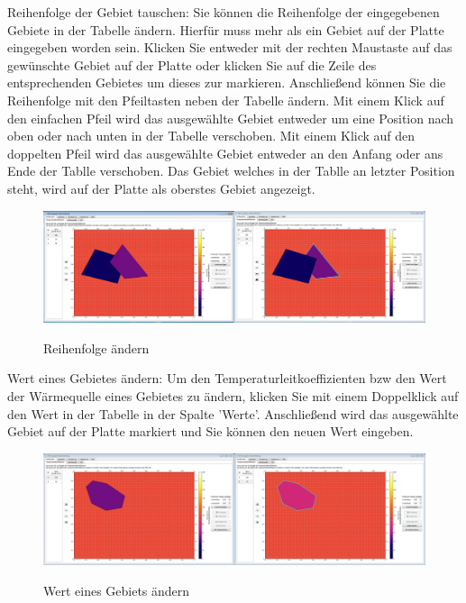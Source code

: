 \noindent
Reihenfolge der Gebiet tauschen: Sie können die Reihenfolge der eingegebenen Gebiete in der Tabelle ändern. Hierfür muss mehr als ein Gebiet auf der Platte eingegeben worden sein. Klicken Sie entweder mit der rechten Maustaste auf das gewünschte Gebiet auf der Platte oder klicken Sie auf die Zeile des entsprechenden Gebietes um dieses zur markieren. Anschließend können Sie die Reihenfolge mit den Pfeiltasten neben der Tabelle ändern. Mit einem Klick auf den einfachen Pfeil wird das ausgewählte Gebiet entweder um eine Position nach oben oder nach unten in der Tabelle verschoben. Mit einem Klick auf den doppelten Pfeil wird das ausgewählte Gebiet entweder an den Anfang oder ans Ende der Tablle verschoben. Das Gebiet welches in der Tablle an letzter Position steht, wird auf der Platte als oberstes Gebiet angezeigt.
\begin{figure}[H]
\centering
\includegraphics[scale=.25]{Benutzerdokumentation/ReihenfolgeAendern.png}\\
\caption{Reihenfolge ändern}
\label{ReihenfolgeAendern}
\end{figure}

\newpage
\noindent
Wert eines Gebietes ändern: Um den Temperaturleitkoeffizienten bzw den Wert der Wärmequelle eines Gebietes zu ändern, klicken Sie mit einem Doppelklick auf den Wert in der Tabelle in der Spalte 'Werte'. Anschließend wird das ausgewählte Gebiet auf der Platte markiert und Sie können den neuen Wert eingeben.
\begin{figure}[H]
\centering
\includegraphics[scale=.25]{Benutzerdokumentation/WertAendern.png}\\
\caption{Wert eines Gebiets ändern}
\label{WertAendern}
\end{figure}

